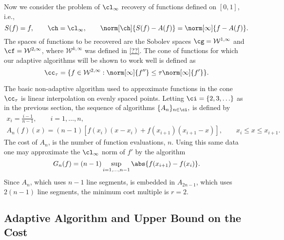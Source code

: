 
Now we consider the problem of $\cl_{\infty}$ recovery of functions defined on $[0,1]$, i.e., 
\[
S(f)=f, \qquad \ch=\cl_{\infty}, \qquad \norm[\ch]{S(f)-A(f)}=\norm[\infty]{f-A(f)}.
\]
The spaces of functions to be recovered are the Sobolev spaces $\cg = \mathcal{W}^{1,\infty}$ and $\cf = \mathcal{W}^{2,\infty}$, where $\mathcal{W}^{k,\infty}$ was defined in \eqref{??}.  The cone of functions for which our adaptive algorithms will be shown to work well is defined as 
\begin{equation}\label{taudef}
\cc_{\tau}=\{f \in  \mathcal{W}^{2,\infty} : \norm[\infty]{f''}\leq \tau\norm[\infty]{f'}\}.
\end{equation}

The basic non-adaptive algorithm used to approximate functions in the cone $\cc_{\tau}$ is linear interpolation on evenly spaced points.  Letting $\ci=\{2, 3, \ldots\}$ as in the previous section, the sequence of algorithms $\{A_n\}_{n \in \ci},$ is defined by
\begin{gather*}
x_i=\frac{i-1}{n-1}, \qquad i=1, \ldots, n, \\
A_{n}(f)(x)=(n-1) \left[ f(x_{i})(x-x_i) +f(x_{i+1})(x_{i+1}-x) \right], \qquad x_i \leq x \leq x_{i+1}.
\end{gather*}
The cost of $A_n$, is the number of function evaluations, $n$.  Using this same data one may approximate the $\cl_\infty$ norm of $f'$ by the algorithm
\begin{equation}\label{estfirstderiv}
G_n(f) = (n-1) \sup_{i=1, \ldots, n-1} \abs{f(x_{i+1})-f(x_i)}.
\end{equation}
Since $A_n$, which uses $n-1$ line segments, is embedded in $A_{2n-1}$, which uses $2(n-1)$ line segments, the minimum cost multiple is $r=2$. 

\subsection{Adaptive Algorithm and Upper Bound on the Cost}

